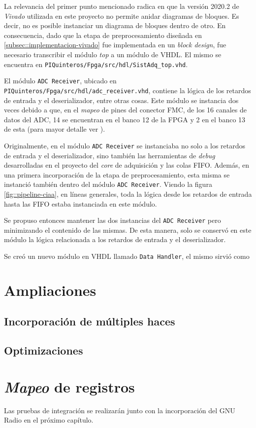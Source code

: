 \documentclass[../../main.tex]{subfiles}
\begin{document}
La relevancia del primer punto mencionado radica en que la versión 2020.2 de \textit{Vivado} utilizada en este proyecto no permite anidar diagramas de bloques. Es decir, no es posible instanciar un diagrama de bloques dentro de otro. En consecuencia, dado que la etapa de preprocesamiento diseñada en \ref{subsec::implementacion-vivado} fue implementada en un \textit{block design}, fue necesario transcribir el módulo \textit{top} a un módulo de VHDL. El mismo se encuentra en \texttt{PIQuinteros/Fpga/src/hdl/SistAdq\_top.vhd}.

El módulo \texttt{ADC Receiver}, ubicado en \texttt{PIQuinteros/Fpga/src/hdl/adc\_receiver.vhd}, contiene la lógica de los retardos de entrada y el deserializador, entre otras cosas. Este módulo se instancia dos veces debido a que, en el \textit{mapeo} de pines del conector FMC, de los 16 canales de datos del ADC, 14 se encuentran en el banco 12 de la FPGA y 2 en el banco 13 de esta (para mayor detalle ver \cite{proyecto-jose}).

Originalmente, en el módulo \texttt{ADC Receiver} se instanciaba no solo a los retardos de entrada y el deserializador, sino también las herramientas de \textit{debug} desarrolladas en el proyecto del \textit{core} de adquisición y las colas FIFO. Además, en una primera incorporación de la etapa de preprocesamiento, esta misma se instanció también dentro del módulo \texttt{ADC Receiver}. Viendo la figura \ref{fig::pipeline-ciaa}, en líneas generales, toda la lógica desde los retardos de entrada hasta las FIFO estaba instanciada en este módulo.

Se propuso entonces mantener las dos instancias del \texttt{ADC Receiver} pero minimizando el contenido de las mismas. De esta manera, solo se conservó en este módulo la lógica relacionada a los retardos de entrada y el deserializador.

Se creó un nuevo módulo en VHDL llamado \texttt{Data Handler}, el mismo sirvió como 

\section{Ampliaciones}
\subsection{Incorporación de múltiples haces}
\subsection{Optimizaciones}

\section{\textit{Mapeo} de registros}

Las pruebas de integración se realizarán junto con la incorporación del GNU Radio en el próximo capítulo.
\end{document}
